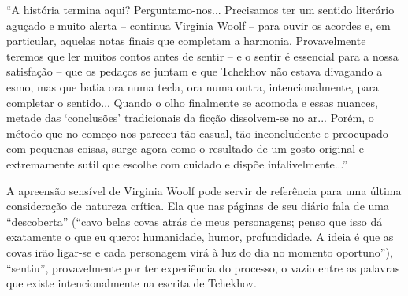 ``A história termina aqui? Perguntamo-nos... Precisamos ter um sentido
literário aguçado e muito alerta -- continua Virginia Woolf -- para
ouvir os acordes e, em particular, aquelas notas finais que completam a
harmonia. Provavelmente teremos que ler muitos contos antes de sentir --
e o sentir é essencial para a nossa satisfação -- que os pedaços se
juntam e que Tchekhov não estava divagando a esmo, mas que batia ora
numa tecla, ora numa outra, intencionalmente, para completar o
sentido... Quando o olho finalmente se acomoda e essas nuances, metade
das `conclusões' tradicionais da ficção dissolvem-se no ar... Porém, o
método que no começo nos pareceu tão casual, tão inconcludente e
preocupado com pequenas coisas, surge agora como o resultado de um gosto
original e extremamente sutil que escolhe com cuidado e dispõe
infalivelmente...''

A apreensão sensível de Virginia Woolf pode servir de referência para
uma última consideração de natureza crítica. Ela que nas páginas de seu
diário fala de uma ``descoberta'' (``cavo belas covas atrás de meus
personagens; penso que isso dá exatamente o que eu quero: humanidade,
humor, profundidade. A ideia é que as covas irão ligar-se e cada
personagem virá à luz do dia no momento oportuno''), ``sentiu'',
provavelmente por ter experiência do processo, o vazio entre as palavras
que existe intencionalmente na escrita de Tchekhov.

